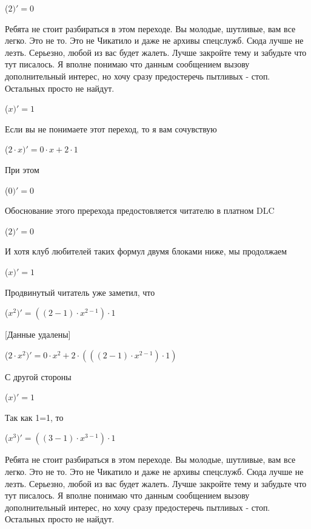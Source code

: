 \documentclass[12pt,a4paper,fleqn]{article}
\begin{document}
\begin{center}
 ($2)'
  = 0$\end{center}
Ребята не стоит разбираться в этом переходе. Вы молодые, шутливые, вам все легко. Это не то. Это не Чикатило и даже не архивы спецслужб. Сюда лучше не лезть. Серьезно, любой из вас будет жалеть. Лучше закройте тему и забудьте что тут писалось. Я вполне понимаю что данным сообщением вызову дополнительный интерес, но хочу сразу предостеречь пытливых - стоп. Остальных просто не найдут.

\begin{center}
 ($x)'
  = 1$\end{center}
Если вы не понимаете этот переход, то я вам сочувствую

\begin{center}
 ($2 \cdot x)'
  = 0 \cdot x+2 \cdot 1$\end{center}
При этом

\begin{center}
 ($0)'
  = 0$\end{center}
Обоснование этого пререхода предостовляется читателю в платном DLC

\begin{center}
 ($2)'
  = 0$\end{center}
И хотя клуб любителей таких формул двумя блоками ниже, мы продолжаем

\begin{center}
 ($x)'
  = 1$\end{center}
Продвинутый читатель уже заметил, что

\begin{center}
 ($x^{2})'
  = ((2-1) \cdot x^{2-1}) \cdot 1$\end{center}
[Данные удалены]

\begin{center}
 ($2 \cdot x^{2})'
  = 0 \cdot x^{2}+2 \cdot (((2-1) \cdot x^{2-1}) \cdot 1)$\end{center}
С другой стороны

\begin{center}
 ($x)'
  = 1$\end{center}
Так как 1=1, то\cite{link4}

\begin{center}
 ($x^{3})'
  = ((3-1) \cdot x^{3-1}) \cdot 1$\end{center}
Ребята не стоит разбираться в этом переходе. Вы молодые, шутливые, вам все легко. Это не то. Это не Чикатило и даже не архивы спецслужб. Сюда лучше не лезть. Серьезно, любой из вас будет жалеть. Лучше закройте тему и забудьте что тут писалось. Я вполне понимаю что данным сообщением вызову дополнительный интерес, но хочу сразу предостеречь пытливых - стоп. Остальных просто не найдут.
\end{document}
